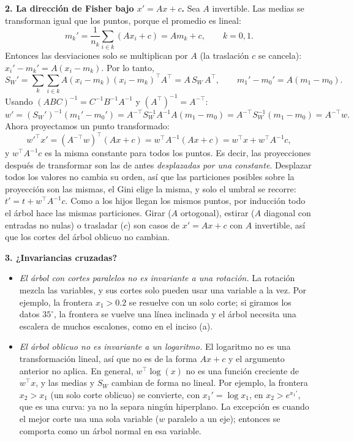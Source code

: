\documentclass[11pt, letterpaper]{article}
\begin{document}
\textbf{2. La dirección de Fisher bajo $x' = Ax + c$.} Sea $A$ invertible. Las medias se transforman igual que los puntos, porque el promedio es lineal:
\[
    m_k' = \frac{1}{n_k}\sum_{i \in k}(Ax_i + c) = A m_k + c, \qquad k = 0, 1.
\]
Entonces las desviaciones solo se multiplican por $A$ (la traslación $c$ se cancela): $x_i' - m_k' = A(x_i - m_k)$. Por lo tanto,
\[
    S_W' = \sum_{k}\sum_{i \in k} A(x_i - m_k)(x_i - m_k)^\top A^\top = A\, S_W\, A^\top,
    \qquad
    m_1' - m_0' = A(m_1 - m_0).
\]
Usando $(ABC)^{-1} = C^{-1}B^{-1}A^{-1}$ y $(A^\top)^{-1} = A^{-\top}$:
\[
    w' = (S_W')^{-1}(m_1' - m_0') = A^{-\top} S_W^{-1} A^{-1} A (m_1 - m_0) = A^{-\top} S_W^{-1}(m_1 - m_0) = A^{-\top} w.
\]
Ahora proyectamos un punto transformado:
\[
    w'^\top x' = (A^{-\top}w)^\top (Ax + c) = w^\top A^{-1}(Ax + c) = w^\top x + w^\top A^{-1} c,
\]
y $w^\top A^{-1} c$ es la misma constante para todos los puntos. Es decir, las proyecciones después de transformar son las de antes \emph{desplazadas por una constante}. Desplazar todos los valores no cambia su orden, así que las particiones posibles sobre la proyección son las mismas, el Gini elige la misma, y solo el umbral se recorre: $t' = t + w^\top A^{-1}c$. Como a los hijos llegan los mismos puntos, por inducción todo el árbol hace las mismas particiones. Girar ($A$ ortogonal), estirar ($A$ diagonal con entradas no nulas) o trasladar ($c$) son casos de $x' = Ax + c$ con $A$ invertible, así que los cortes del árbol oblicuo no cambian.

\textbf{3. ¿Invariancias cruzadas?}
\begin{itemize}
    \item \emph{El árbol con cortes paralelos no es invariante a una rotación.} La rotación mezcla las variables, y sus cortes solo pueden usar una variable a la vez. Por ejemplo, la frontera $x_1 > 0.2$ se resuelve con un solo corte; si giramos los datos $35^\circ$, la frontera se vuelve una línea inclinada y el árbol necesita una escalera de muchos escalones, como en el inciso (a).
    \item \emph{El árbol oblicuo no es invariante a un logaritmo.} El logaritmo no es una transformación lineal, así que no es de la forma $Ax + c$ y el argumento anterior no aplica. En general, $w^\top \log(x)$ no es una función creciente de $w^\top x$, y las medias y $S_W$ cambian de forma no lineal. Por ejemplo, la frontera $x_2 > x_1$ (un solo corte oblicuo) se convierte, con $x_1' = \log x_1$, en $x_2 > e^{x_1'}$, que es una curva: ya no la separa ningún hiperplano. La excepción es cuando el mejor corte usa una sola variable ($w$ paralelo a un eje); entonces se comporta como un árbol normal en esa variable.
\end{itemize}
\end{document}
